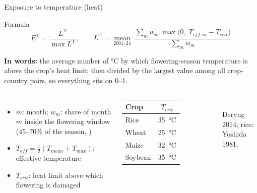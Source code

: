 \documentclass[aspectratio=169,11pt]{beamer}
\newcommand{\TT}{\mathrm{T}}   %
\begin{document}
\begin{frame}{Exposure to temperature (heat)}
\begin{block}{Formula}
\[E^{\TT}=\frac{L^{\TT}}{\max L^{\TT}},\qquad L^{\TT}=\operatorname*{mean}_{2001\text{--}24}\ \frac{\sum_m w_m\,\max\!\big(0,\;T_{eff,m}-T_{crit}\big)}{\sum_m w_m}\]
\end{block}
\textbf{In words:} the average number of \si{\celsius} by which flowering-season temperature is above the crop's heat limit; then divided by the largest value among all crop-country pairs, so everything sits on 0--1.

\begin{columns}[T]
\footnotesize
\begin{itemize}\setlength{\itemsep}{2pt}
\item $m$: month; $w_m$: share of month $m$ inside the flowering window (45--70\% of the season, \cite{deryng2014})
\item $T_{eff}=\tfrac12(T_{mean}+T_{max})$: effective temperature
\item $T_{crit}$: heat limit above which flowering is damaged
\end{itemize}
\footnotesize
\begin{tabular}{@{}lc@{}}
\toprule
Crop & $T_{crit}$\\
\midrule
Rice & \SI{35}{\celsius}\\
Wheat & \SI{25}{\celsius}\\
Maize & \SI{32}{\celsius}\\
Soybean & \SI{35}{\celsius}\\
\bottomrule
\end{tabular}\\[0.3em]
Deryng 2014; rice: Yoshida 1981.\\[0.3em]
\end{columns}
\end{frame}
\end{document}
